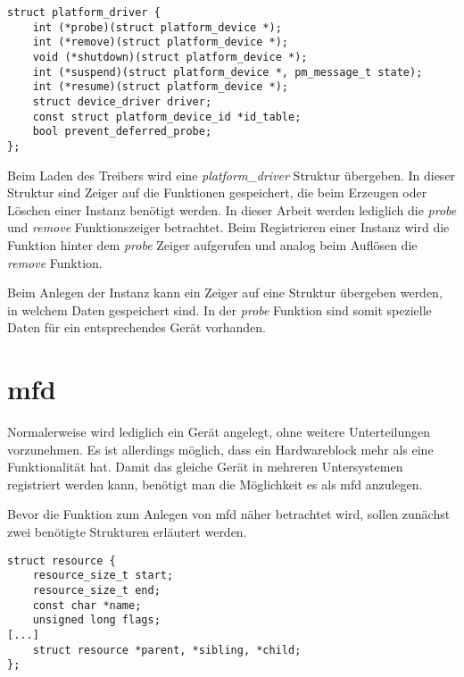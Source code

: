 \begin{lstfloat}
\begin{lstlisting}
struct platform_driver {
	int (*probe)(struct platform_device *);
	int (*remove)(struct platform_device *);
	void (*shutdown)(struct platform_device *);
	int (*suspend)(struct platform_device *, pm_message_t state);
	int (*resume)(struct platform_device *);
	struct device_driver driver;
	const struct platform_device_id *id_table;
	bool prevent_deferred_probe;
};
\end{lstlisting}
\end{lstfloat}

Beim Laden des Treibers wird eine \textit{platform\_driver} Struktur übergeben. In dieser Struktur sind Zeiger auf die Funktionen gespeichert, die beim Erzeugen oder Löschen einer Instanz benötigt werden.  
In dieser Arbeit werden lediglich die \textit{probe} und \textit{remove} Funktionszeiger betrachtet. Beim Registrieren einer Instanz wird die Funktion hinter dem \textit{probe} Zeiger aufgerufen und analog beim Auflösen die \textit{remove} Funktion.\cite{corbetplatform}  %

Beim Anlegen der Instanz kann ein Zeiger auf eine Struktur übergeben werden, in welchem Daten gespeichert sind. In der \textit{probe} Funktion sind somit spezielle Daten für ein entsprechendes Gerät vorhanden. \cite{corbetplatform} %

\section{\acl{mfd}}\label{sec:mfd_t}
Normalerweise wird lediglich ein Gerät angelegt, ohne weitere Unterteilungen vorzunehmen. Es ist allerdings möglich, dass ein Hardwareblock mehr als eine Funktionalität hat. Damit das gleiche Gerät in mehreren Untersystemen registriert werden kann, benötigt man die Möglichkeit es als \ac{mfd} anzulegen. \cite{bellonimfd} %

Bevor die Funktion zum Anlegen von \ac{mfd} näher betrachtet wird, sollen zunächst zwei benötigte Strukturen erläutert werden.

\begin{lstfloat}
\begin{lstlisting}
struct resource {
	resource_size_t start;
	resource_size_t end;
	const char *name;
	unsigned long flags;
[...]
	struct resource *parent, *sibling, *child;
};
\end{lstlisting}
\end{lstfloat}

